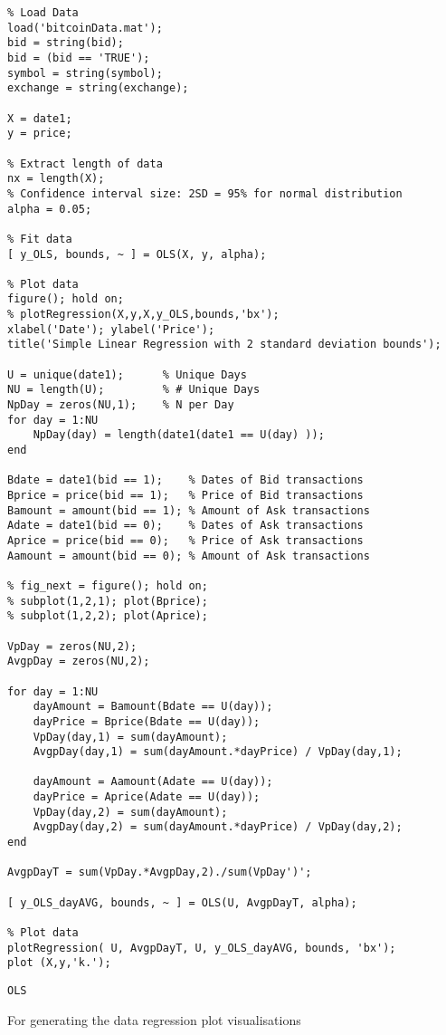 \documentclass{article}
\begin{document}
\begin{lstlisting}
% Load Data 
load('bitcoinData.mat');
bid = string(bid);
bid = (bid == 'TRUE');
symbol = string(symbol);
exchange = string(exchange);

X = date1;
y = price;

% Extract length of data
nx = length(X);
% Confidence interval size: 2SD = 95% for normal distribution
alpha = 0.05;

% Fit data
[ y_OLS, bounds, ~ ] = OLS(X, y, alpha);

% Plot data
figure(); hold on;
% plotRegression(X,y,X,y_OLS,bounds,'bx');
xlabel('Date'); ylabel('Price');
title('Simple Linear Regression with 2 standard deviation bounds');

U = unique(date1);      % Unique Days
NU = length(U);         % # Unique Days
NpDay = zeros(NU,1);    % N per Day
for day = 1:NU
    NpDay(day) = length(date1(date1 == U(day) ));
end

Bdate = date1(bid == 1);    % Dates of Bid transactions
Bprice = price(bid == 1);   % Price of Bid transactions
Bamount = amount(bid == 1); % Amount of Ask transactions
Adate = date1(bid == 0);    % Dates of Ask transactions
Aprice = price(bid == 0);   % Price of Ask transactions
Aamount = amount(bid == 0); % Amount of Ask transactions

% fig_next = figure(); hold on;
% subplot(1,2,1); plot(Bprice);
% subplot(1,2,2); plot(Aprice);

VpDay = zeros(NU,2);
AvgpDay = zeros(NU,2);

for day = 1:NU
    dayAmount = Bamount(Bdate == U(day));
    dayPrice = Bprice(Bdate == U(day));
    VpDay(day,1) = sum(dayAmount);
    AvgpDay(day,1) = sum(dayAmount.*dayPrice) / VpDay(day,1);
    
    dayAmount = Aamount(Adate == U(day));
    dayPrice = Aprice(Adate == U(day));
    VpDay(day,2) = sum(dayAmount);
    AvgpDay(day,2) = sum(dayAmount.*dayPrice) / VpDay(day,2);
end

AvgpDayT = sum(VpDay.*AvgpDay,2)./sum(VpDay')';

[ y_OLS_dayAVG, bounds, ~ ] = OLS(U, AvgpDayT, alpha);

% Plot data
plotRegression( U, AvgpDayT, U, y_OLS_dayAVG, bounds, 'bx');
plot (X,y,'k.');
\end{lstlisting}


\texttt{OLS}

For generating the data regression plot visualisations
\end{document}
